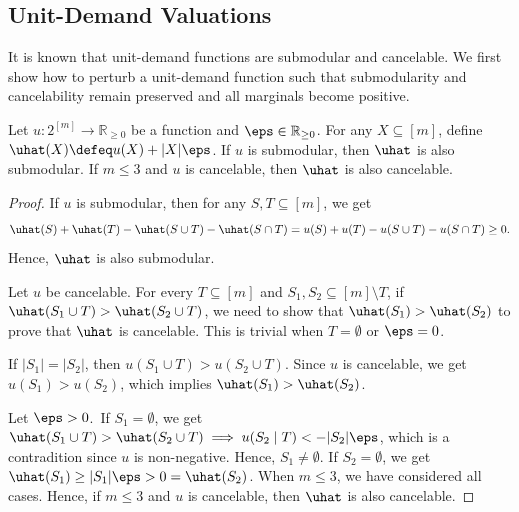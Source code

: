 \subsection{Unit-Demand Valuations}
\label{sec:cex-extra:unit-demand}

It is known that unit-demand functions are submodular and cancelable.
We first show how to perturb a unit-demand function such that
submodularity and cancelability remain preserved and all marginals become positive.

\begin{lemma}
\label{thm:ud-perturb}
Let $u: 2^{[m]} \to \mathbb{R}_{\ge 0}$ be a function and $\eps \in \mathbb{R}_{\ge 0}$.
For any $X \subseteq [m]$, define $\uhat(X) \defeq u(X) + |X|\eps$.
If $u$ is submodular, then $\uhat$ is also submodular.
If $m \le 3$ and $u$ is cancelable, then $\uhat$ is also cancelable.
\end{lemma}
\begin{proof}
If $u$ is submodular, then for any $S, T \subseteq [m]$, we get
\[ \uhat(S) + \uhat(T) - \uhat(S \cup T) - \uhat(S \cap T)
= u(S) + u(T) - u(S \cup T) - u(S \cap T) \ge 0. \]
Hence, $\uhat$ is also submodular.

Let $u$ be cancelable.
For every $T \subseteq [m]$ and $S_1, S_2 \subseteq [m] \setminus T$,
if $\uhat(S_1 \cup T) > \uhat(S_2 \cup T)$,
we need to show that $\uhat(S_1) > \uhat(S_2)$
to prove that $\uhat$ is cancelable.
This is trivial when $T = \emptyset$ or $\eps = 0$.

If $|S_1| = |S_2|$, then $u(S_1 \cup T) > u(S_2 \cup T)$.
Since $u$ is cancelable, we get $u(S_1) > u(S_2)$, which implies $\uhat(S_1) > \uhat(S_2)$.

Let $\eps > 0$. If $S_1 = \emptyset$, we get
$\uhat(S_1 \cup T) > \uhat(S_2 \cup T) \implies u(S_2 \mid T) < - |S_2|\eps$,
which is a contradition since $u$ is non-negative. Hence, $S_1 \neq \emptyset$.
If $S_2 = \emptyset$, we get $\uhat(S_1) \ge |S_1|\eps > 0 = \uhat(S_2)$.
When $m \le 3$, we have considered all cases.
Hence, if $m \le 3$ and $u$ is cancelable, then $\uhat$ is also cancelable.
\end{proof}

